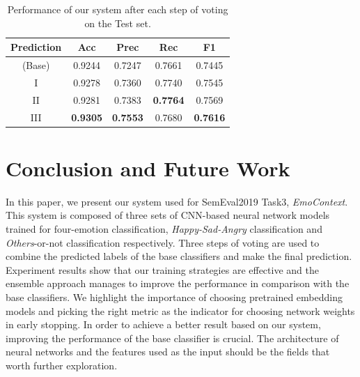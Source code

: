 \documentclass[11pt,a4paper]{article}
\begin{document}
\begin{table}\small
\begin{center}
\begin{tabular}{c|cccc}
\hline
\bf Prediction & \bf Acc & \bf Prec & \bf Rec & \bf F1 \\ 
\hline
(Base) & 0.9244 & 0.7247 & 0.7661 & 0.7445 \\
I & 0.9278 & 0.7360 & 0.7740 & 0.7545 \\
II & 0.9281 & 0.7383 & \bf 0.7764 & 0.7569 \\
III & \bf 0.9305 & \bf 0.7553 & 0.7680 & \bf 0.7616 \\
\hline
\end{tabular}
\end{center}
\caption{\label{tab:boosting_mat} Performance of our system after each step of voting on the Test set.}
\end{table}

\section{Conclusion and Future Work}
\label{sec:conclusion}

In this paper, we present our system used for SemEval2019 Task3, {\em EmoContext}. This system is composed of three sets of CNN-based neural network models trained for four-emotion classification, {\em Happy-Sad-Angry} classification and {\em Others}-or-not classification respectively. Three steps of voting are used to combine the predicted labels of the base classifiers and make the final prediction. Experiment results show that our training strategies are effective and the ensemble approach manages to improve the performance in comparison with the base classifiers. We highlight the importance of choosing pretrained embedding models and picking the right metric as the indicator for choosing network weights in early stopping. In order to achieve a better result based on our system, improving the performance of the base classifier is crucial. The architecture of neural networks and the features used as the input should be the fields that worth further exploration.



\end{document}

